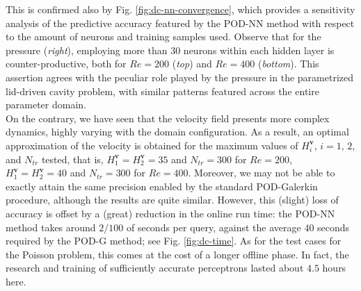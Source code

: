 \documentclass{elsarticle}
\numberwithin{equation}{section}
\theoremstyle{theorem}
\theoremstyle{definition}
\theoremstyle{remark}
\theoremstyle{proposition}
\numberwithin{figure}{section}
\newcommand{\bg}[1]{\boldsymbol{#1}}
\begin{document}
		This is confirmed also by Fig. \ref{fig:dc-nn-convergence}, which provides a sensitivity analysis of the predictive accuracy featured by the POD-NN method with respect to the amount of neurons and training samples used. Observe that for the pressure (\emph{right}), employing more than $30$ neurons within each hidden layer is counter-productive, both for $Re = 200$ (\emph{top}) and $Re = 400$ (\emph{bottom}). This assertion agrees with the peculiar role played by the pressure in the parametrized lid-driven cavity problem, with similar patterns featured across the entire parameter domain. \\
		
		On the contrary, we have seen that the velocity field presents more complex dynamics, highly varying with the domain configuration. As a result, an optimal approximation of the velocity is obtained for the maximum values of $H_i^{\bg{v}}$, $i = 1, \, 2$, and $N_{tr}$ tested, that is, $H_1^{\bg{v}} = H_2^{\bg{v}} = 35$ and $N_{tr} = 300$ for $Re = 200$, $H_1^{\bg{v}} = H_2^{\bg{v}} = 40$ and $N_{tr} = 300$ for $Re = 400$. Moreover, we may not be able to exactly attain the same precision enabled by the standard POD-Galerkin procedure, although the results are quite similar. However, this (slight) loss of accuracy is offset by a (great) reduction in the online run time: the POD-NN method takes around $2/100$ of seconds per query, against the average $40$ seconds required by the POD-G method; see Fig. \ref{fig:dc-time}. As for the test cases for the Poisson problem, this comes at the cost of a longer offline phase. In fact, the research and training of sufficiently accurate perceptrons lasted about $4.5$ hours here.
										
\end{document}
